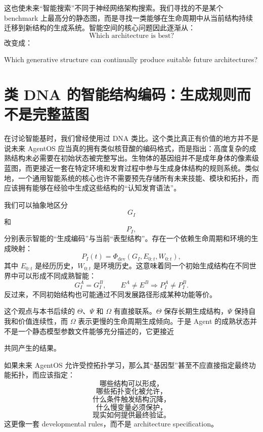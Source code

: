 这也使未来“智能搜索”不同于神经网络架构搜索。我们寻找的不是某个 benchmark 上最高分的静态图，而是寻找一类能够在生命周期中从当前结构持续迁移到新结构的生成系统。智能空间的核心问题因此逐渐从：
\[
\text{Which architecture is best?}
\]
改变成：
\begin{statementbox}
Which generative structure can continually produce suitable future architectures?
\end{statementbox}

\section{类 DNA 的智能结构编码：生成规则而不是完整蓝图}

在讨论智能基时，我们曾经使用过 DNA 类比。这个类比真正有价值的地方并不是说未来 AgentOS 应当真的拥有类似核苷酸的编码格式，而是指出：高度复杂的成熟结构未必需要在初始状态被完整写出。生物体的基因组并不是成年身体的像素级蓝图，而更接近一套在特定环境和发育过程中参与生成身体结构的规则系统。类似地，一个通用智能系统的核心也许不需要预先存储所有未来技能、模块和拓扑，而应该拥有能够在经验中生成这些结构的“认知发育语法”。

我们可以抽象地区分
\[
G_I
\]
和
\[
P_I,
\]
分别表示智能的“生成编码”与当前“表型结构”。存在一个依赖生命周期和环境的生成映射：
\[
\boxed{
P_I(t)
=
\Phi_{\mathrm{dev}}
\left(
G_I,
E_{0:t},
W_{0:t}
\right),
}
\]
其中 $E_{0:t}$ 是经历历史，$W_{0:t}$ 是环境历史。这意味着同一个初始生成结构在不同世界中可以形成不同成熟智能：
\[
G_I^A=G_I^B,
\qquad
E^A\neq E^B
\Rightarrow
P_I^A\neq P_I^B.
\]
反过来，不同初始结构也可能通过不同发展路径形成某种功能等价。

这个观点与本书后续的 $\Theta$、$\Psi$ 和 $\Omega$ 有直接联系。$\Theta$ 保存长期生成结构，$\Psi$ 保持自我和价值连续性，而 $\Omega$ 表示更慢的生命周期生成倾向。于是 Agent 的成熟状态并不是一个静态模型参数文件能够充分描述的，它更接近
\begin{statementbox}
\centering
{}
\end{statementbox}
共同产生的结果。

如果未来 AgentOS 允许受控拓扑学习，那么其“基因型”甚至不应直接指定最终功能拓扑，而应该指定：
\[
\text{哪些结构可以形成，}
\]
\[
\text{哪些拓扑变化被允许，}
\]
\[
\text{什么条件触发结构沉降，}
\]
\[
\text{什么慢变量必须保护，}
\]
\[
\text{现实如何提供最终验证。}
\]
这更像一套 developmental rules，而不是 architecture specification。


